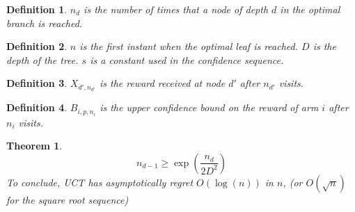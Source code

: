 \documentclass[11pt]{article}
\theoremstyle{definitionstyle}
\newtheorem{defn}{Definition}
\newtheorem{thm}{Theorem}
\newenvironment{framedminipage}
    {\begin{framed}\begin{minipage}{0.9\textwidth}}
    {\end{minipage}\end{framed}}
\begin{document}
\begin{framedminipage}
\begin{defn}
$n_d$ is the number of times that a node of depth $d$ in the optimal branch is reached. 
\end{defn}
\begin{defn}
$n$ is the first instant when the optimal leaf is reached. $D$ is the depth of the tree. $s$ is a constant used in the confidence sequence. 
\end{defn}
\begin{defn}
$X_{d',n_{d'}}$ is the reward received at node $d'$ after $n_{d'}$ visits. 
\end{defn}
\begin{defn}
$B_{i,p,n_i}$ is the upper confidence bound on the reward of arm $i$ after $n_i$ visits.
\end{defn}
\end{framedminipage}
\begin{framedminipage}
\begin{thm}
\[
    n_{d-1}\ge\exp(\frac{n_d}{2D^2})
\]
To conclude, UCT has asymptotically regret $O(\log(n))$ in $n$, (or $O(\sqrt{n})$ for the square root sequence)
\end{thm}
\end{framedminipage}
\end{document}
